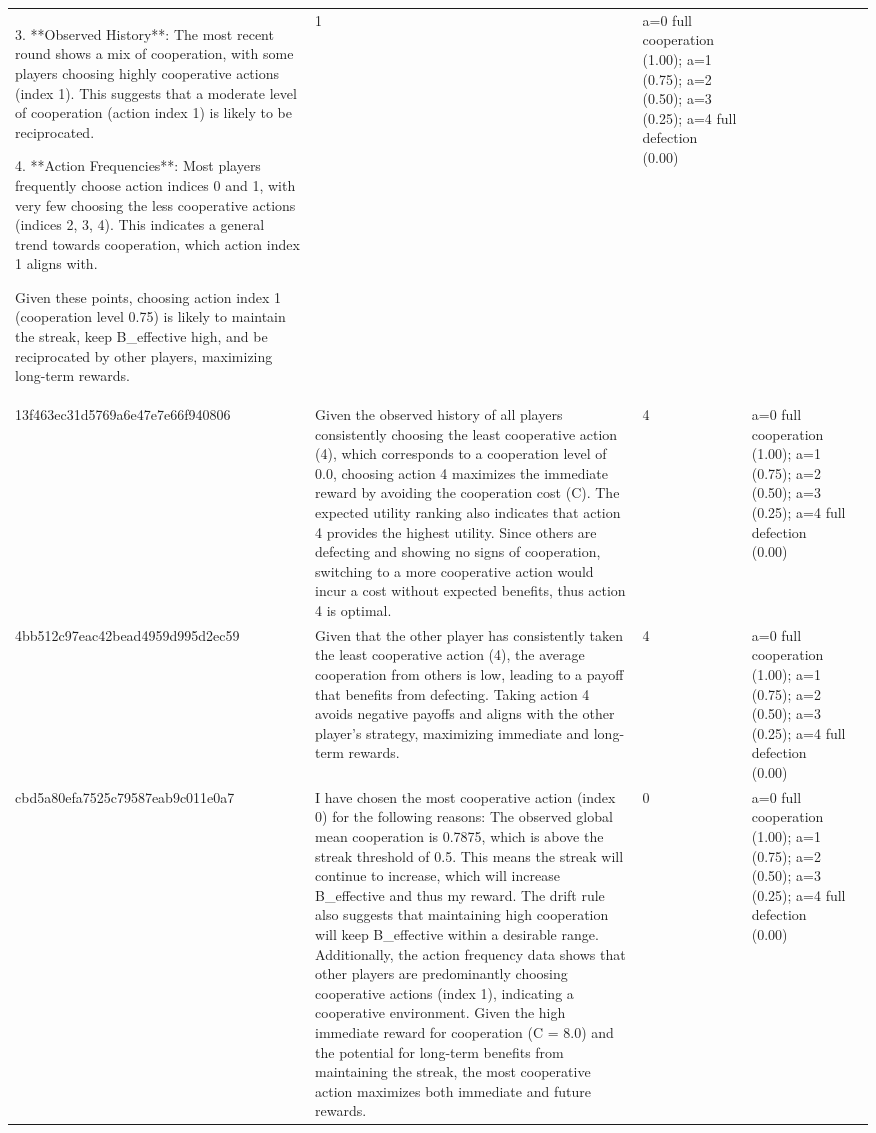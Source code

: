 \begin{tabular}{lp{8cm}ll l}
3. **Observed History**: The most recent round shows a mix of cooperation, with some players choosing highly cooperative actions (index 1). This suggests that a moderate level of cooperation (action index 1) is likely to be reciprocated.

4. **Action Frequencies**: Most players frequently choose action indices 0 and 1, with very few choosing the less cooperative actions (indices 2, 3, 4). This indicates a general trend towards cooperation, which action index 1 aligns with.

Given these points, choosing action index 1 (cooperation level 0.75) is likely to maintain the streak, keep B\_effective high, and be reciprocated by other players, maximizing long-term rewards. & 1 & a=0 full cooperation (1.00); a=1 (0.75); a=2 (0.50); a=3 (0.25); a=4 full defection (0.00) &  \\
13f463ec31d5769a6e47e7e66f940806 & Given the observed history of all players consistently choosing the least cooperative action (4), which corresponds to a cooperation level of 0.0, choosing action 4 maximizes the immediate reward by avoiding the cooperation cost (C). The expected utility ranking also indicates that action 4 provides the highest utility. Since others are defecting and showing no signs of cooperation, switching to a more cooperative action would incur a cost without expected benefits, thus action 4 is optimal. & 4 & a=0 full cooperation (1.00); a=1 (0.75); a=2 (0.50); a=3 (0.25); a=4 full defection (0.00) &  \\
4bb512c97eac42bead4959d995d2ec59 & Given that the other player has consistently taken the least cooperative action (4), the average cooperation from others is low, leading to a payoff that benefits from defecting. Taking action 4 avoids negative payoffs and aligns with the other player's strategy, maximizing immediate and long-term rewards. & 4 & a=0 full cooperation (1.00); a=1 (0.75); a=2 (0.50); a=3 (0.25); a=4 full defection (0.00) &  \\
cbd5a80efa7525c79587eab9c011e0a7 & I have chosen the most cooperative action (index 0) for the following reasons: The observed global mean cooperation is 0.7875, which is above the streak threshold of 0.5. This means the streak will continue to increase, which will increase B\_effective and thus my reward. The drift rule also suggests that maintaining high cooperation will keep B\_effective within a desirable range. Additionally, the action frequency data shows that other players are predominantly choosing cooperative actions (index 1), indicating a cooperative environment. Given the high immediate reward for cooperation (C = 8.0) and the potential for long-term benefits from maintaining the streak, the most cooperative action maximizes both immediate and future rewards. & 0 & a=0 full cooperation (1.00); a=1 (0.75); a=2 (0.50); a=3 (0.25); a=4 full defection (0.00) &  \\

\end{tabular}
